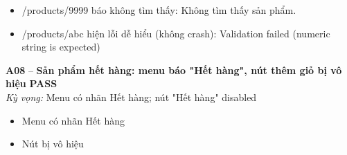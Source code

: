 \documentclass[a4paper,11pt]{article}
\newcommand{\ok}{\textcolor{okgreen}{\textbf{PASS}}}
\begin{document}
\begin{itemize}\footnotesize
\item \tick /products/9999 báo không tìm thấy: Không tìm thấy sản phẩm.
\item \tick /products/abc hiện lỗi dễ hiểu (không crash): Validation failed (numeric string is expected)
\end{itemize}
\begin{minipage}{\textwidth}\vspace{4pt}\textbf{\textcolor{brew}{A08}} -- \textbf{Sản phẩm hết hàng: menu báo "Hết hàng", nút thêm giỏ bị vô hiệu} \hfill \ok\\
{\small\emph{Kỳ vọng:} Menu có nhãn Hết hàng; nút "Hết hàng" disabled}
\end{minipage}
\begin{itemize}\footnotesize
\item \tick Menu có nhãn Hết hàng
\item \tick Nút bị vô hiệu
\end{itemize}
\end{document}
